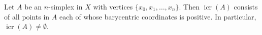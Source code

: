 Let $A$ be an $n$-simplex in $X$ with vertices $\{x_0, x_1, \ldots, x_n\}$. Then $\operatorname{icr}(A)$ consists of all points in $A$ each of whose barycentric coordinates is positive. In particular, $\operatorname{icr}(A) \neq \emptyset$.
